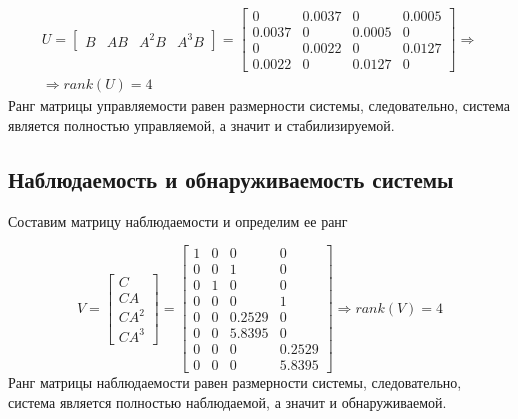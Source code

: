\begin{multline}
    U = \begin{bmatrix}
        B & AB & A^2B&A^3B
    \end{bmatrix} = \begin{bmatrix}
        0 &   0.0037  &       0  &  0.0005\\
    0.0037      &   0   & 0.0005   &      0\\
         0   & 0.0022   &      0  &  0.0127\\
    0.0022     &    0 &   0.0127   &      0
    \end{bmatrix} \Rightarrow\\
    \Rightarrow rank(U) = 4
\end{multline}
Ранг матрицы управляемости равен размерности системы, следовательно, система является полностью управляемой, а значит и стабилизируемой.


\subsection{Наблюдаемость и обнаруживаемость системы}

Составим матрицу наблюдаемости и определим ее ранг

\begin{equation}
    V = \begin{bmatrix}
        C \\ CA \\ CA^2\\ CA^3
    \end{bmatrix} = \begin{bmatrix}
           1&         0     &    0    &     0\\
         0   &      0 &   1  &      0\\
         0 &   1 &         0 &        0\\
         0     &    0&         0 &   1\\
         0    &     0 &    0.2529     &    0\\
         0     &    0 &   5.8395    &     0\\
         0     &    0    &     0  &  0.2529\\
         0     &    0    &     0   & 5.8395
    \end{bmatrix} 
    \Rightarrow rank(V) = 4
\end{equation}
Ранг матрицы наблюдаемости равен размерности системы, следовательно, система является полностью наблюдаемой, а значит и обнаруживаемой.

